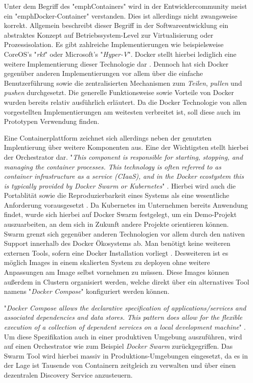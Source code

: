 Unter dem Begriff des "emph{Containers}" wird in der Entwicklercommunity meist ein "emph{Docker-Container}" verstanden. Dies ist allerdings nicht zwangsweise korrekt. Allgemein beschreibt dieser Begriff in der Softwareentwicklung ein abstraktes Konzept auf Betriebssystem-Level zur Virtualisierung oder Prozessisolation. Es gibt zahlreiche Implementierungen wie beispielsweise CoreOS's "\emph{rkt}" oder Microsoft's "\emph{Hyper-V}". Docker stellt hierbei lediglich eine weitere Implementierung dieser Technologie dar \cite[Seite~63 ff.]{continuous-deliverty}. Dennoch hat sich Docker gegenüber anderen Implementierungen vor allem über die einfache Benutzerführung sowie die zentralisierten Mechanismen zum \emph{Teilen}, \emph{pullen} und \emph{pushen} durchgesetzt. Die generelle Funktionsweise sowie Vorteile von Docker wurden bereits relativ ausführlich erläutert. Da die Docker Technologie von allen vorgestellten Implementierungen am weitesten verbreitet ist, soll diese auch im Prototypen Verwendung finden. 

Eine Containerplattform zeichnet sich allerdings neben der genutzten Implentierung über weitere Komponenten aus. Eine der Wichtigsten stellt hierbei der Orchestrator dar. "\emph{This component is responsible for starting, stopping, and managing the container processes. This technology is often referred to as container infrastructure as a service (CIaaS), and in the Docker ecostystem this is typically provided by Docker Swarm or Kubernetes}" \cite[Seite~64 ff.]{continuous-delivery}. Hierbei wird auch die Portablität sowie die Reproduzierbarkeit eines Systems als eine wesentliche Anforderung vorausgesetzt \cite[Kapitel Orchestration]{docker-doc}. Da Kubernetes im Unternehmen bereits Anwendung findet, wurde sich hierbei auf Docker Swarm festgelegt, um ein Demo-Projekt auszuarbeiten, an dem sich in Zukunft andere Projekte orientieren können. Swarm grenzt sich gegenüber anderen Technologien vor allem durch den nativen Support innerhalb des Docker Ökosystems ab. Man benötigt keine weiteren externen Tools, sofern eine Docker Installation vorliegt \cite[Seite~10 ff.]{soppelsaswarm}. Desweiteren ist es möglich Images in einem skalierten System zu deployen ohne weitere Anpassungen am Image selbst vornehmen zu müssen. Diese Images können außerdem in Clustern organisiert werden, welche direkt über ein alternatives Tool namens "\emph{Docker Compose}" konfiguriert werden können.

"\emph{Docker Compose allows the declarative specification of applications/services and associated dependencies and data stores. This pattern does allow for the flexible execution of a collection of dependent services on a local development machine}" \cite[Seite~173]{continuous-delivery}. Um diese Spezifikation auch in einer produktiven Umgebung auszuführen, wird auf einen Orchestrator wie zum Beispiel \emph{Docker Swarm} zurückgegriffen. Das Swarm Tool wird hierbei massiv in Produktions-Umgebungen eingesetzt, da es in der Lage ist Tausende von Containern zeitgleich zu verwalten und über einen dezentralen Discovery Service anzusteuern. 

